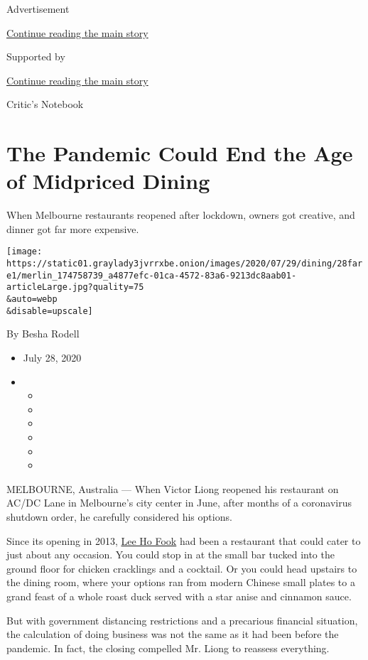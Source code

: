 Advertisement

\protect\hyperlink{after-top}{Continue reading the main story}

Supported by

\protect\hyperlink{after-sponsor}{Continue reading the main story}

Critic's Notebook

\hypertarget{the-pandemic-could-end-the-age-of-midpriced-dining}{%
\section{The Pandemic Could End the Age of Midpriced
Dining}\label{the-pandemic-could-end-the-age-of-midpriced-dining}}

When Melbourne restaurants reopened after lockdown, owners got creative,
and dinner got far more expensive.

\texttt{[image: https://static01.graylady3jvrrxbe.onion/images/2020/07/29/dining/28fare1/merlin\_174758739\_a4877efc-01ca-4572-83a6-9213dc8aab01-articleLarge.jpg?quality=75\\\&auto=webp\\\&disable=upscale]}

By Besha Rodell

\begin{itemize}
\item
  July 28, 2020
\item
  \begin{itemize}
  \item
  \item
  \item
  \item
  \item
  \item
  \end{itemize}
\end{itemize}

MELBOURNE, Australia --- When Victor Liong reopened his restaurant on
AC/DC Lane in Melbourne's city center in June, after months of a
coronavirus shutdown order, he carefully considered his options.

Since its opening in 2013, \href{https://www.leehofook.com.au/}{Lee Ho
Fook} had been a restaurant that could cater to just about any occasion.
You could stop in at the small bar tucked into the ground floor for
chicken cracklings and a cocktail. Or you could head upstairs to the
dining room, where your options ran from modern Chinese small plates to
a grand feast of a whole roast duck served with a star anise and
cinnamon sauce.

But with government distancing restrictions and a precarious financial
situation, the calculation of doing business was not the same as it had
been before the pandemic. In fact, the closing compelled Mr. Liong to
reassess everything.

